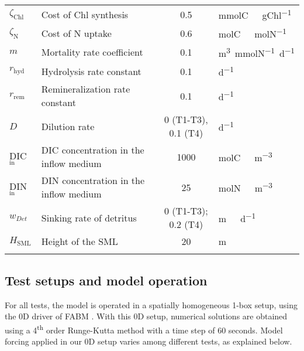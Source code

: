 \documentclass[gmd, manuscript]{copernicus}
\begin{document}
\begin{table*}[htb]
\begin{tabular}{l l c l}
    $\zeta_{\text{Chl}}$   & Cost of Chl synthesis  & 0.5       & \unit{mmolC\ gChl^{-1}}\\
    $\zeta_{\text{N}}$     & Cost of N uptake               & 0.6       & \unit{molC\ molN^{-1}}\\
    $m$                & Mortality rate coefficient        & 0.1   & \unit{m^{3} mmolN^{-1} d^{-1}} \\
    $r_{\text{hyd}}$   & Hydrolysis rate constant          & 0.1   & \unit{d^{-1}} \\
    $r_{\text{rem}}$   & Remineralization rate constant    & 0.1   & \unit{d^{-1}} \\
    $D$   & Dilution rate    & 0 (T1-T3), 0.1 (T4)   & \unit{d^{-1}} \\
    DIC$_{\text{in}}$   & DIC concentration in the inflow medium  & 1000   & \unit{molC\ m^{-3}} \\
    DIN$_{\text{in}}$   & DIN concentration in the inflow medium  & 25   & \unit{molN\ m^{-3}} \\
    $w_{Det}$   & Sinking rate of detritus    & 0 (T1-T3); 0.2 (T4)   & \unit{m\  d^{-1}} \\
    $H_{\text{SML}}$   & Height of the SML    & 20   & \unit{m} \\
    \bottomhline
  \end{tabular}
  \belowtable{} %
\end{table*}

\subsection{Test setups and model operation}\label{S:DescSetup}
    For all tests, the model is operated in a spatially homogeneous 1-box setup, using the 0D driver of FABM \citep{Bruggeman2014}. With this 0D setup, numerical solutions are obtained using a 4\textsuperscript{th} order Runge-Kutta method with a time step of 60 seconds. Model forcing applied in our 0D setup varies among different tests, as explained below.
\end{document}
